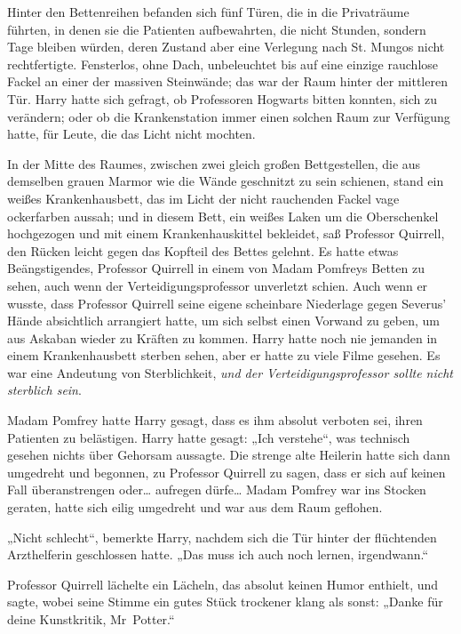 {Hinter den Bettenreihen befanden sich fünf Türen, die in die Privaträume führten, in denen sie die Patienten aufbewahrten, die nicht Stunden, sondern Tage bleiben würden, deren Zustand aber eine Verlegung nach St. Mungos nicht rechtfertigte. Fensterlos, ohne Dach, unbeleuchtet bis auf eine einzige rauchlose Fackel an einer der massiven Steinwände; das war der Raum hinter der mittleren Tür. Harry hatte sich gefragt, ob Professoren Hogwarts bitten konnten, sich zu verändern; oder ob die Krankenstation immer einen solchen Raum zur Verfügung hatte, für Leute, die das Licht nicht mochten.

In der Mitte des Raumes, zwischen zwei gleich großen Bettgestellen, die aus demselben grauen Marmor wie die Wände geschnitzt zu sein schienen, stand ein weißes Krankenhausbett, das im Licht der nicht rauchenden Fackel vage ockerfarben aussah; und in diesem Bett, ein weißes Laken um die Oberschenkel hochgezogen und mit einem Krankenhauskittel bekleidet, saß Professor Quirrell, den Rücken leicht gegen das Kopfteil des Bettes gelehnt. Es hatte etwas Beängstigendes, Professor Quirrell in einem von Madam Pomfreys Betten zu sehen, auch wenn der Verteidigungsprofessor unverletzt schien. Auch wenn er wusste, dass Professor Quirrell seine eigene scheinbare Niederlage gegen Severus' Hände absichtlich arrangiert hatte, um sich selbst einen Vorwand zu geben, um aus Askaban wieder zu Kräften zu kommen. Harry hatte noch nie jemanden in einem Krankenhausbett sterben sehen, aber er hatte zu viele Filme gesehen. Es war eine Andeutung von Sterblichkeit, \emph{und der Verteidigungsprofessor sollte nicht sterblich sein}.

Madam Pomfrey hatte Harry gesagt, dass es ihm absolut verboten sei, ihren Patienten zu belästigen. Harry hatte gesagt: „Ich verstehe“, was technisch gesehen nichts über Gehorsam aussagte. Die strenge alte Heilerin hatte sich dann umgedreht und begonnen, zu Professor Quirrell zu sagen, dass er sich auf keinen Fall überanstrengen oder… aufregen dürfe… Madam Pomfrey war ins Stocken geraten, hatte sich eilig umgedreht und war aus dem Raum geflohen.

„Nicht schlecht“, bemerkte Harry, nachdem sich die Tür hinter der flüchtenden Arzthelferin geschlossen hatte. „Das muss ich auch noch lernen, irgendwann.“

Professor Quirrell lächelte ein Lächeln, das absolut keinen Humor enthielt, und sagte, wobei seine Stimme ein gutes Stück trockener klang als sonst: „Danke für deine Kunstkritik, Mr~Potter.“

}
